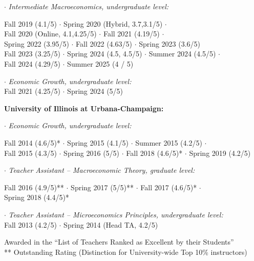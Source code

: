 \documentclass[mm, 10pt]{simple_style}
\begin{document}
\begin{resume}
$\cdot$  \textit{Intermediate Macroeconomics, undergraduate level:}\\
\indent \hspace{1cm}  \begin{minipage}[t]{0.75\textwidth}
Fall 2019 (4.1/5) $\cdot$ Spring 2020 (Hybrid, 3.7,3.1/5) $\cdot$ \\
Fall 2020 (Online, 4.1,4.25/5) $\cdot$ Fall 2021 (4.19/5) $\cdot$ \\
Spring 2022 (3.95/5) $\cdot$ Fall 2022 (4.63/5) $\cdot$ Spring 2023 (3.6/5) \\
Fall 2023 (3.25/5) $\cdot$ Spring 2024 (4.5, 4.5/5) $\cdot$ Summer 2024 (4.5/5) $\cdot$ \\
Fall 2024 (4.29/5) $\cdot$ Summer 2025 (4 / 5)
\end{minipage}

$\cdot$  \textit{Economic Growth, undergraduate level:} \\
\indent \hspace{1cm}  Fall 2021 (4.25/5) $\cdot$ Spring 2024 (5/5)

\textbf{University of Illinois at Urbana-Champaign:}

$\cdot$ \textit{Economic Growth, undergraduate level:} \\
\indent \hspace{1cm}  \begin{minipage}[t]{0.8\textwidth}
Fall 2014 (4.6/5)* $\cdot$ Spring 2015 (4.1/5) $\cdot$ Summer 2015 (4.2/5) $\cdot$ \\
Fall 2015 (4.3/5) $\cdot$ Spring 2016 (5/5) $\cdot$ Fall 2018 (4.6/5)* $\cdot$ Spring 2019 (4.2/5)
\end{minipage}

$\cdot$ \textit{Teacher Assistant -- Macroeconomic Theory, graduate level:} \\
\indent \hspace{1cm}  \begin{minipage}[t]{0.75\textwidth}
Fall 2016 (4.9/5)** $\cdot$ Spring 2017 (5/5)** $\cdot$ Fall 2017 (4.6/5)* $\cdot$ \\
Spring 2018 (4.4/5)*
\end{minipage}

$\cdot$ \textit{Teacher Assistant -- Microeconomics Principles, undergraduate level:} \\
\indent \hspace{1cm}  Fall 2013 (4.2/5) $\cdot$ Spring 2014 (Head TA, 4.2/5)

{\small * Awarded in the ``List of Teachers Ranked as Excellent by their Students'' \\
** Outstanding Rating (Distinction for University-wide Top 10\% instructors)}


\end{resume}
\end{document}

